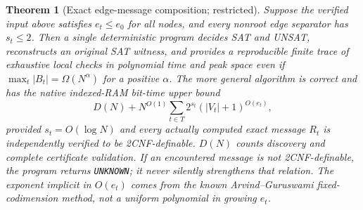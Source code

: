 \documentclass[11pt]{article}
\newtheorem{theorem}{Theorem}
\begin{document}
\begin{theorem}[Exact edge-message composition; restricted]\label{th:main}
Suppose the verified input above satisfies $e_t\le e_0$ for all nodes, and every nonroot edge separator has $s_t\le2$.  Then a single deterministic program decides SAT and UNSAT, reconstructs an original SAT witness, and provides a reproducible finite trace of exhaustive local checks in polynomial time and peak space \emph{even if} $\max_t|B_t|=\Omega(N^\alpha)$ for a positive $\alpha$.  The more general algorithm is correct and has the native indexed-RAM bit-time upper bound
\[
 D(N)+N^{O(1)}\sum_{t\in T}2^{s_t} (|V_t|+1)^{O(e_t)},\tag{1}
\]
provided $s_t=O(\log N)$ and every \emph{actually computed} exact message $R_t$ is independently verified to be 2CNF-definable.  $D(N)$ counts discovery and complete certificate validation.  If an encountered message is not 2CNF-definable, the program returns \texttt{UNKNOWN}; it never silently strengthens that relation.  The exponent implicit in $O(e_t)$ comes from the \emph{known} Arvind--Guruswami fixed-codimension method, not a uniform polynomial in growing $e_t$.
\end{theorem}
\end{document}
